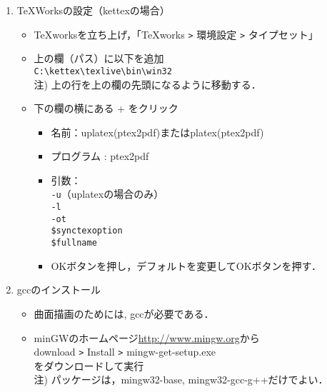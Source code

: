 \documentclass{ujarticle}
\begin{document}
\begin{enumerate}[\bf\large 1.]
\item TeXWorksの設定（kettexの場合）
  \begin{itemize}
   \item TeXworksを立ち上げ，「TeXworks \verb|>| 環境設定 \verb|>| タイプセット」
  \item 上の欄（パス）に以下を追加\\
  \hspace*{5mm}\verb|C:\kettex\texlive\bin\win32|\\
  \hspace*{10mm}注) 上の行を上の欄の先頭になるように移動する．
  \item 下の欄の横にある + をクリック
    \begin{itemize}
    \item 名前：uplatex(ptex2pdf)またはplatex(ptex2pdf)
    \item プログラム : ptex2pdf
    \item 引数：\\
    \hspace*{10mm} \verb|-u|（uplatexの場合のみ）\\
    \hspace*{10mm} \verb|-l|\\
    \hspace*{10mm} \verb|-ot|\\
    \hspace*{10mm}  \verb|$synctexoption|\\
    \hspace*{10mm}  \verb|$fullname|
    \item[]OKボタンを押し，デフォルトを変更してOKボタンを押す．
    \end{itemize}
  \end{itemize}

\item gccのインストール
  \begin{itemize}
    \item 曲面描画のためには, gccが必要である．
    \item minGWのホームページ\url{http://www.mingw.org}から\\
    \hspace*{10mm}download \verb|>| Install \verb|>| mingw-get-setup.exe\\
    をダウンロードして実行\\
    \hspace*{10mm}注) パッケージは，mingw32-base, mingw32-gcc-g++だけでよい．
  \end{itemize}


\end{enumerate}
\end{document}
